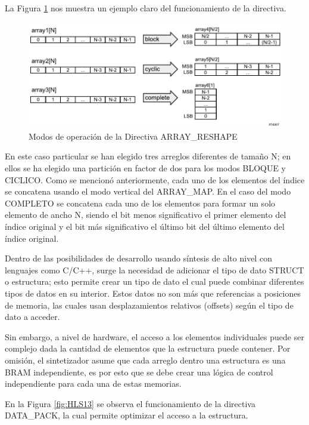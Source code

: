 La Figura \ref{fig:HLS12} nos muestra un ejemplo claro del funcionamiento de la directiva.

\begin{figure}[H]
	\centering
		\includegraphics[scale=0.8]{./Figures/HLS12.pdf}
	\caption{Modos de operación de la Directiva ARRAY\_RESHAPE \citep{HLS2015}}
	\label{fig:HLS12}
\end{figure}

En este caso particular se han elegido tres arreglos diferentes de tamaño N; en ellos se ha elegido una partición en factor de dos para los modos BLOQUE y CICLICO. Como se mencionó anteriormente, cada uno de los elementos del índice se concatena usando el modo vertical del ARRAY\_MAP. En el caso del modo COMPLETO se concatena cada uno de los elementos para formar un solo elemento de ancho N, siendo el bit menos significativo el primer elemento del índice original y el bit más significativo el último bit del último elemento del índice original.

Dentro de las posibilidades de desarrollo usando síntesis de alto nivel con lenguajes como C/C++, surge la necesidad de adicionar el tipo de dato STRUCT o estructura; esto permite crear un tipo de dato el cual puede combinar diferentes tipos de datos en su interior. Estos datos no son más que referencias a posiciones de memoria, las cuales usan desplazamientos relativos (offsets) según el tipo de dato a acceder.

Sin embargo, a nivel de hardware, el acceso a los elementos individuales puede ser complejo dada la cantidad de elementos que la estructura puede contener. Por omisión, el sintetizador asume que cada arreglo dentro una estructura es una BRAM independiente, es por esto que se debe crear una lógica de control independiente para cada una de estas memorias.

En la Figura \ref{fig:HLS13} se observa el funcionamiento de la directiva DATA\_PACK, la cual permite optimizar el acceso a la estructura.

